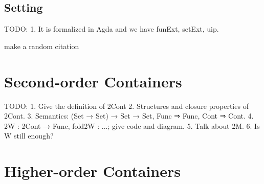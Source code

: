 \documentclass{easychair}
\begin{document}
\subsection*{Setting}

TODO:
1. It is formalized in Agda and we have funExt, setExt, uip.

make a random citation\cite{bird1998nested}

\section*{Second-order Containers}

TODO:
1. Give the definition of 2Cont
2. Structures and closure properties of 2Cont.
3. Semantics: (Set → Set) → Set → Set, Func ⇒ Func, Cont ⇒ Cont.
4. 2W : 2Cont → Func, fold2W : ...; give code and diagram.
5. Talk about 2M.
6. Is W still enough?

\section*{Higher-order Containers}




\end{document}
